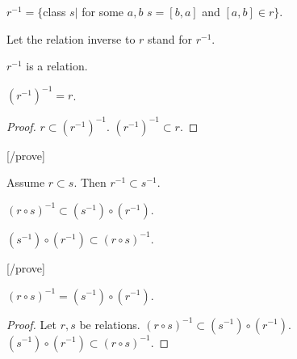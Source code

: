 \documentclass[a4paper,draft]{amsproc}
\begin{document}
\begin{forthel}
\begin{definition}[60]
$r^{-1} = \{$class $s |$ for some $a,b$ $s = [b,a]$ and $[a,b] \in r\}$.
\end{definition}
Let the relation inverse to $r$ stand for $r^{-1}$.

\begin{lemma}
$r^{-1}$ is a relation.
\end{lemma}

\begin{theorem}[61]
$(r^{-1})^{-1} = r$.
\end{theorem}
\begin{proof}
$r \subset (r^{-1})^{-1}$.
$(r^{-1})^{-1} \subset r$.
\end{proof}
[/prove]

\begin{lemma}[62a]
Assume $r \subset s$. Then $r^{-1} \subset s^{-1}$.
\end{lemma}

\begin{lemma}[62b]
$(r \circ s)^{-1} \subset (s^{-1}) \circ (r^{-1})$.
\end{lemma}

\begin{lemma}
$(s^{-1}) \circ (r^{-1}) \subset (r \circ s)^{-1}$.
\end{lemma}
[/prove]

\begin{theorem}[62]
$(r \circ s)^{-1} = (s^{-1}) \circ (r^{-1})$.
\end{theorem}
\begin{proof}
Let $r,s$ be relations.
$(r \circ s)^{-1} \subset (s^{-1}) \circ (r^{-1})$.
$(s^{-1}) \circ (r^{-1}) \subset (r \circ s)^{-1}$.
\end{proof}

\end{forthel}
\end{document}
